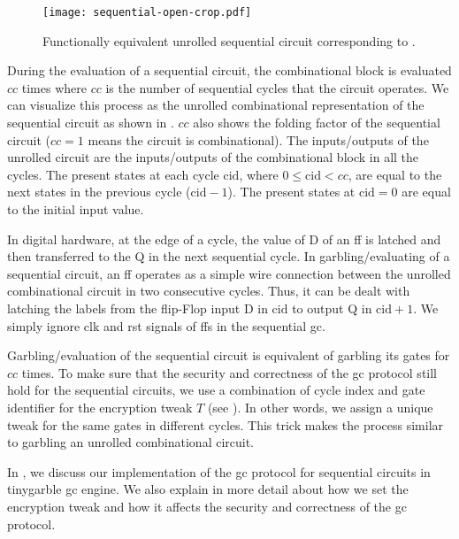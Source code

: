 \begin{figure}
  \centering
  \texttt{[image: sequential-open-crop.pdf]}
  \caption{Functionally equivalent unrolled sequential circuit corresponding to .}
  \label{fig:open-sequential}
\end{figure}

During the evaluation of a sequential circuit, the combinational block is evaluated $cc$ times where $cc$ is the number of sequential cycles that the circuit operates.
We can visualize this process as the unrolled combinational representation of the sequential circuit as shown in .
$cc$ also shows the folding factor of the sequential circuit ($cc=1$ means the circuit is combinational).
The inputs/outputs of the unrolled circuit are the inputs/outputs of the combinational block in all the cycles.
The present states at each cycle $\textrm{cid}$, where $0 \le \textrm{cid} < cc$, are equal to the next states in the previous cycle ($\textrm{cid}-1$).
The present states at $\textrm{cid}=0$ are equal to the initial input value.

In digital hardware, at the edge of a cycle, the value of D of an \acrshort{ff} is latched and then transferred to the Q in the next sequential cycle.
In garbling/evaluating of a sequential circuit, an \acrshort{ff} operates as a simple wire connection between the unrolled combinational circuit in two consecutive cycles.
Thus, it can be dealt with latching the labels from the flip-Flop input D in $\textrm{cid}$ to output Q in $\textrm{cid}+1$.
We simply ignore clk and rst signals of \acrshort{ff}s in the sequential \acrshort{gc}.

Garbling/evaluation of the sequential circuit is equivalent of garbling its gates for $cc$ times.
To make sure that the security and correctness of the \acrshort{gc} protocol still hold for the sequential circuits, we use a combination of cycle index and gate identifier for the encryption tweak $T$ (see ).
In other words, we assign a unique tweak for the same gates in different cycles.
This trick makes the process similar to garbling an unrolled combinational circuit.

In , we discuss our implementation of the \acrshort{gc} protocol for sequential circuits in \gls{tinygarble} \acrshort{gc} engine.
We also explain in more detail about how we set the encryption tweak and how it affects the security and correctness of the \acrshort{gc} protocol.

